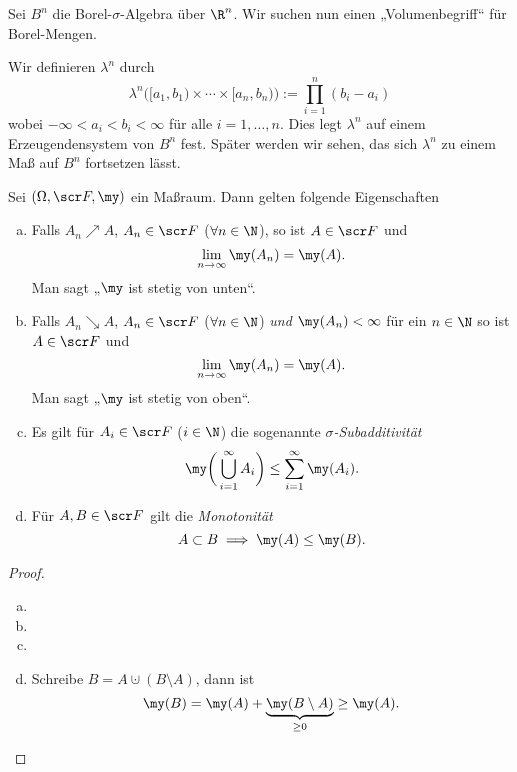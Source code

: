 \begin{ex} \label{1.1.9}
	Sei $B^n$ die Borel-$\sigma$-Algebra über $\R^n$.
	Wir suchen nun einen „Volumenbegriff“ für Borel-Mengen.

	Wir definieren $\lambda^n$ durch
	\[
		\lambda^n \Big( [a_1,b_1) \times \dotsb \times [a_n,b_n) \Big)
		:= \prod_{i=1}^n (b_i-a_i)
	\]
	wobei $-\infty < a_i < b_i < \infty$ für alle $i = 1, \dotsc, n$.
	Dies legt $\lambda^n$ auf einem Erzeugendensystem von $B^n$ fest.
	Später werden wir sehen, das sich $\lambda^n$ zu einem Maß auf $B^n$ fortsetzen lässt.
\end{ex}

\begin{lem} \label{1.1.10}
	Sei $(\Omega, \scr F, \my)$ ein Maßraum.
	Dann gelten folgende Eigenschaften
	\begin{enumerate}[(a)]
		\item
			Falls $A_n \nearrow A$, $A_n \in \scr F$ ($\forall n\in \N$), so ist $A \in \scr F$ und
			\[
				\lim_{n\to \infty} \my (A_n) = \my(A).
			\]
			Man sagt „$\my$ ist stetig von unten“.
		\item
			Falls $A_n \searrow A$, $A_n \in \scr F$ ($\forall n\in \N$) \emph{und} $\my(A_n) < \infty$ für ein $n \in \N$ so ist $A \in \scr F$ und
			\[
				\lim_{n\to \infty} \my(A_n) = \my(A).
			\]
			Man sagt „$\my$ ist stetig von oben“.
		\item
			Es gilt für $A_i \in \scr F$ ($i \in \N$) die sogenannte \emph{$\sigma$-Subadditivität}
			\[
				\my \bigg( \bigcup_{i=1}^\infty A_i \bigg)
				\le \sum_{i=1}^\infty \my (A_i).
			\]
		\item
			Für $A, B \in \scr F$ gilt die \emph{Monotonität}
			\[
				A \subset B
				\implies
				\my(A) \le \my(B).
			\]
	\end{enumerate}
	\begin{proof}
		\begin{enumerate}[(a)]
			\item
			\item
			\item
			\item
				Schreibe $B = A \cupdot (B \setminus A)$, dann ist
				\[
					\my(B) = \my(A) + \underbrace{\my(B\setminus A)}_{\ge 0} \ge \my(A).
				\]
		\end{enumerate}
	\end{proof}

\end{lem}
